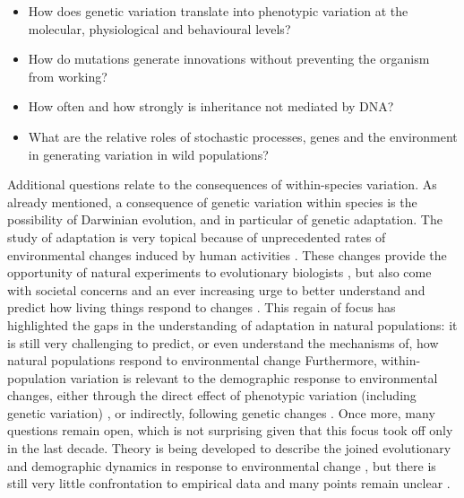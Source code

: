 \begin{itemize}
\item How does genetic variation translate into phenotypic variation at the molecular, physiological and behavioural levels? \parencite{Kirschner2010}
\item How do mutations generate innovations without preventing the organism from working? \parencite{Wagner2014} 
\item How often and how strongly is inheritance not mediated by DNA? \parencite{Bonduriansky2012}
\item What are the relative roles of stochastic processes, genes and the environment in generating variation in wild populations? \parencite{Raj2008, Postma2014}
\end{itemize}

Additional questions relate to the consequences of within-species variation. As already mentioned, a consequence of genetic variation within species is the possibility of Darwinian evolution, and in particular of genetic adaptation. The study of adaptation is very topical because of unprecedented rates of environmental changes induced by human activities \parencite{parmesan2006}. These changes provide the opportunity of natural experiments to evolutionary biologists \parencite{Altermatt2016, Brookfield2016}, but also come with societal concerns and an ever increasing urge to better understand and predict how living things respond to changes \parencite{McCarty2001, Shaw2013}. This regain of focus has highlighted the gaps in the understanding of adaptation in natural populations: it is still very challenging to predict, or even understand the mechanisms of, how natural populations respond to environmental change \parencite{Merila2001, Tafani2013, Shaw2013, Brookfield2016}
Furthermore, within-population variation is relevant to the demographic response to environmental changes, either through the direct effect of phenotypic variation (including genetic variation) \parencite{Kendall2011, vindenes2015, Plard2016}, or indirectly, following genetic changes \parencite{Chevin2010a, Turcotte2011, Schiffers2013a}. Once more, many questions remain open, which is not surprising given that this focus took off only in the last decade. Theory is being developed to describe the joined evolutionary and demographic dynamics in response to environmental change \parencite{Chevin2010a, Childs2016}, but there is still very little confrontation to empirical data \parencite{Chevin2012, Gonzalez2013a} and many points remain unclear \parencite{Charmantier2014climate, Gonzalez2013a}. 

